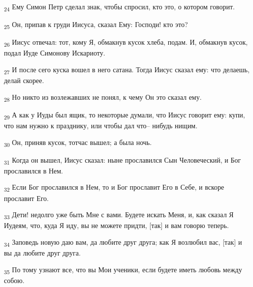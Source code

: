 \begin{tcolorbox}
\textsubscript{24} Ему Симон Петр сделал знак, чтобы спросил, кто это, о котором говорит.
\end{tcolorbox}
\begin{tcolorbox}
\textsubscript{25} Он, припав к груди Иисуса, сказал Ему: Господи! кто это?
\end{tcolorbox}
\begin{tcolorbox}
\textsubscript{26} Иисус отвечал: тот, кому Я, обмакнув кусок хлеба, подам. И, обмакнув кусок, подал Иуде Симонову Искариоту.
\end{tcolorbox}
\begin{tcolorbox}
\textsubscript{27} И после сего куска вошел в него сатана. Тогда Иисус сказал ему: что делаешь, делай скорее.
\end{tcolorbox}
\begin{tcolorbox}
\textsubscript{28} Но никто из возлежавших не понял, к чему Он это сказал ему.
\end{tcolorbox}
\begin{tcolorbox}
\textsubscript{29} А как у Иуды был ящик, то некоторые думали, что Иисус говорит ему: купи, что нам нужно к празднику, или чтобы дал что-- нибудь нищим.
\end{tcolorbox}
\begin{tcolorbox}
\textsubscript{30} Он, приняв кусок, тотчас вышел; а была ночь.
\end{tcolorbox}
\begin{tcolorbox}
\textsubscript{31} Когда он вышел, Иисус сказал: ныне прославился Сын Человеческий, и Бог прославился в Нем.
\end{tcolorbox}
\begin{tcolorbox}
\textsubscript{32} Если Бог прославился в Нем, то и Бог прославит Его в Себе, и вскоре прославит Его.
\end{tcolorbox}
\begin{tcolorbox}
\textsubscript{33} Дети! недолго уже быть Мне с вами. Будете искать Меня, и, как сказал Я Иудеям, что, куда Я иду, вы не можете придти, [так] и вам говорю теперь.
\end{tcolorbox}
\begin{tcolorbox}
\textsubscript{34} Заповедь новую даю вам, да любите друг друга; как Я возлюбил вас, [так] и вы да любите друг друга.
\end{tcolorbox}
\begin{tcolorbox}
\textsubscript{35} По тому узнают все, что вы Мои ученики, если будете иметь любовь между собою.
\end{tcolorbox}
